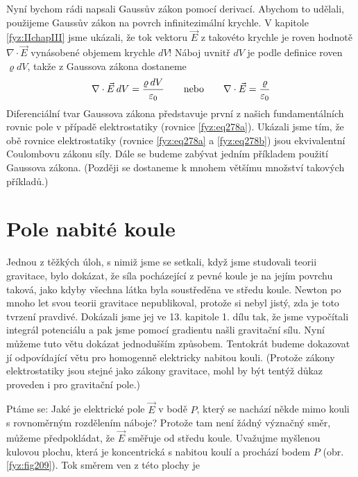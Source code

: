 {    Nyní bychom rádi napsali Gaussův zákon pomocí derivací. Abychom to udělali, použijeme Gaussův 
    zákon na povrch infinitezimální krychle. V kapitole \ref{fyz:IIchapIII} jsme ukázali, 
    že tok vektoru \(\vec{E}\) z takovéto krychle je roven hodnotě \(\nabla\cdot\vec{E}\) 
    vynásobené objemem krychle \(dV\)! Náboj uvnitř \(dV\) je podle definice roven \(\varrho dV\), 
    takže z Gaussova zákona dostaneme
    \begin{equation}\label{fyz:fey_eq_elstat38}
     \nabla\cdot\vec{E}\hspace{2pt}dV = \frac{\varrho\hspace{2pt}dV}{\varepsilon_0} \qquad 
     \text{nebo} \qquad
     \nabla\cdot\vec{E}       = \frac{\varrho}{\varepsilon_0}
    \end{equation}
    Diferenciální tvar Gaussova zákona představuje první z našich fundamentálních rovnic pole v 
    případě elektrostatiky (rovnice \ref{fyz:eq278a}). Ukázali jsme tím, že obě rovnice 
    elektrostatiky (rovnice \ref{fyz:eq278a} a \ref{fyz:eq278b}) jsou 
    ekvivalentní Coulombovu zákonu síly. Dále se budeme zabývat jedním příkladem použití Gaussova 
    zákona. (Později se dostaneme k mnohem většímu množství takových příkladů.)
    
  \section{Pole nabité koule}\label{fyz:IIchapIVsecVII}
    \cite[s.~77]{Feynman02} Jednou z těžkých úloh, s nimiž jsme se setkali, když jsme studovali 
    teorii gravitace, bylo dokázat, že síla pocházející z pevné koule je na jejím povrchu taková, 
    jako kdyby všechna látka byla soustředěna ve středu koule. Newton po mnoho let svou teorii 
    gravitace nepublikoval, protože si nebyl jistý, zda je toto tvrzení pravdivé. Dokázali jsme jej 
    ve 13. kapitole 1. dílu tak, že jsme vypočítali integrál potenciálu a pak jsme pomocí gradientu 
    našli gravitační sílu. Nyní můžeme tuto větu dokázat jednodušším způsobem. Tentokrát budeme 
    dokazovat jí odpovídající větu pro homogenně elektricky nabitou kouli. (Protože zákony 
    elektrostatiky jsou stejné jako zákony gravitace, mohl by být tentýž důkaz proveden i pro 
    gravitační pole.)
    
    Ptáme se: Jaké je elektrické pole \(\vec{E}\) v bodě \(P\), který se nachází někde mimo kouli s 
    rovnoměrným rozdělením náboje? Protože tam není žádný význačný směr, můžeme předpokládat, že 
    \(\vec{E}\) směřuje od středu koule. Uvažujme myšlenou kulovou plochu, která je koncentrická s 
    nabitou koulí a prochází bodem \(P\) (obr. \ref{fyz:fig209}). Tok směrem ven z 
    této plochy je

}
